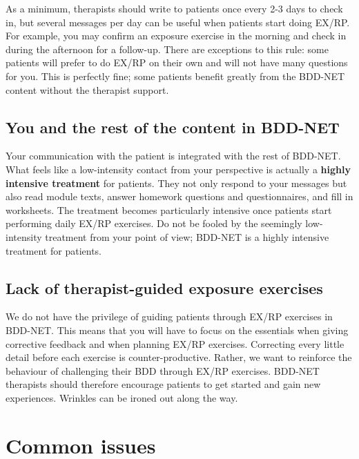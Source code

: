 \documentclass[]{book}
\theoremstyle{definition}
\theoremstyle{definition}
\theoremstyle{definition}
\theoremstyle{remark}
\begin{document}
As a minimum, therapists should write to patients once every 2-3 days to
check in, but several messages per day can be useful when patients start
doing EX/RP. For example, you may confirm an exposure exercise in the
morning and check in during the afternoon for a follow-up. There are
exceptions to this rule: some patients will prefer to do EX/RP on their
own and will not have many questions for you. This is perfectly fine;
some patients benefit greatly from the BDD-NET content without the
therapist support.

\hypertarget{you-and-the-rest-of-the-content-in-bdd-net}{%
\subsection{You and the rest of the content in
BDD-NET}\label{you-and-the-rest-of-the-content-in-bdd-net}}

Your communication with the patient is integrated with the rest of
BDD-NET. What feels like a low-intensity contact from your perspective
is actually a \textbf{highly intensive treatment} for patients. They not
only respond to your messages but also read module texts, answer
homework questions and questionnaires, and fill in worksheets. The
treatment becomes particularly intensive once patients start performing
daily EX/RP exercises. Do not be fooled by the seemingly low-intensity
treatment from your point of view; BDD-NET is a highly intensive
treatment for patients.

\hypertarget{lack-of-therapist-guided-exposure-exercises-1}{%
\subsection{Lack of therapist-guided exposure
exercises}\label{lack-of-therapist-guided-exposure-exercises-1}}

We do not have the privilege of guiding patients through EX/RP exercises
in BDD-NET. This means that you will have to focus on the essentials
when giving corrective feedback and when planning EX/RP exercises.
Correcting every little detail before each exercise is
counter-productive. Rather, we want to reinforce the behaviour of
challenging their BDD through EX/RP exercises. BDD-NET therapists should
therefore encourage patients to get started and gain new experiences.
Wrinkles can be ironed out along the way.

\hypertarget{common-issues}{%
\section{Common issues}\label{common-issues}}
\end{document}
